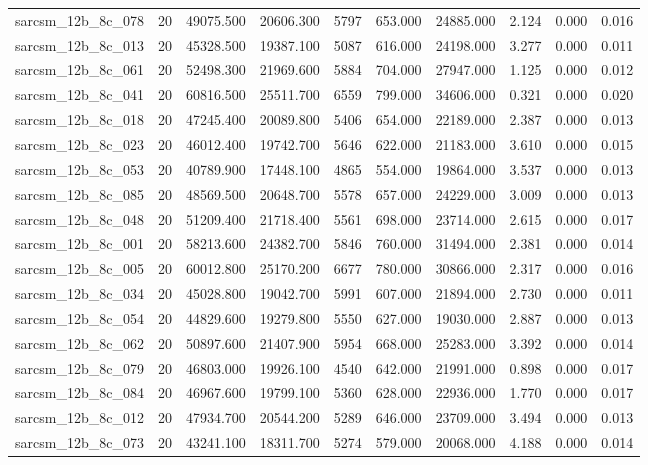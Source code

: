 \begin{tabular}{lrrrrrrrrr}
sarcsm\_12b\_8c\_078 & 20 & 49075.500 & 20606.300 & 5797 & 653.000 & 24885.000 & 2.124 & 0.000 & 0.016 \\
sarcsm\_12b\_8c\_013 & 20 & 45328.500 & 19387.100 & 5087 & 616.000 & 24198.000 & 3.277 & 0.000 & 0.011 \\
sarcsm\_12b\_8c\_061 & 20 & 52498.300 & 21969.600 & 5884 & 704.000 & 27947.000 & 1.125 & 0.000 & 0.012 \\
sarcsm\_12b\_8c\_041 & 20 & 60816.500 & 25511.700 & 6559 & 799.000 & 34606.000 & 0.321 & 0.000 & 0.020 \\
sarcsm\_12b\_8c\_018 & 20 & 47245.400 & 20089.800 & 5406 & 654.000 & 22189.000 & 2.387 & 0.000 & 0.013 \\
sarcsm\_12b\_8c\_023 & 20 & 46012.400 & 19742.700 & 5646 & 622.000 & 21183.000 & 3.610 & 0.000 & 0.015 \\
sarcsm\_12b\_8c\_053 & 20 & 40789.900 & 17448.100 & 4865 & 554.000 & 19864.000 & 3.537 & 0.000 & 0.013 \\
sarcsm\_12b\_8c\_085 & 20 & 48569.500 & 20648.700 & 5578 & 657.000 & 24229.000 & 3.009 & 0.000 & 0.013 \\
sarcsm\_12b\_8c\_048 & 20 & 51209.400 & 21718.400 & 5561 & 698.000 & 23714.000 & 2.615 & 0.000 & 0.017 \\
sarcsm\_12b\_8c\_001 & 20 & 58213.600 & 24382.700 & 5846 & 760.000 & 31494.000 & 2.381 & 0.000 & 0.014 \\
sarcsm\_12b\_8c\_005 & 20 & 60012.800 & 25170.200 & 6677 & 780.000 & 30866.000 & 2.317 & 0.000 & 0.016 \\
sarcsm\_12b\_8c\_034 & 20 & 45028.800 & 19042.700 & 5991 & 607.000 & 21894.000 & 2.730 & 0.000 & 0.011 \\
sarcsm\_12b\_8c\_054 & 20 & 44829.600 & 19279.800 & 5550 & 627.000 & 19030.000 & 2.887 & 0.000 & 0.013 \\
sarcsm\_12b\_8c\_062 & 20 & 50897.600 & 21407.900 & 5954 & 668.000 & 25283.000 & 3.392 & 0.000 & 0.014 \\
sarcsm\_12b\_8c\_079 & 20 & 46803.000 & 19926.100 & 4540 & 642.000 & 21991.000 & 0.898 & 0.000 & 0.017 \\
sarcsm\_12b\_8c\_084 & 20 & 46967.600 & 19799.100 & 5360 & 628.000 & 22936.000 & 1.770 & 0.000 & 0.017 \\
sarcsm\_12b\_8c\_012 & 20 & 47934.700 & 20544.200 & 5289 & 646.000 & 23709.000 & 3.494 & 0.000 & 0.013 \\
sarcsm\_12b\_8c\_073 & 20 & 43241.100 & 18311.700 & 5274 & 579.000 & 20068.000 & 4.188 & 0.000 & 0.014 \\

\end{tabular}
